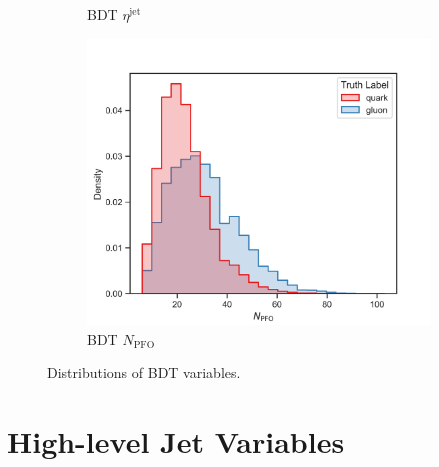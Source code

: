 \begin{figure}[!htb]
\begin{subfigure}[t]{0.45\textwidth}
        \caption{BDT $\eta^{\mathrm{jet}}$}
        \label{fig:app_bdt_eta_jet}
    \end{subfigure}
    \begin{subfigure}[t]{0.45\textwidth}
        \includegraphics[width=\linewidth]{src/plots/distributions/BDT/N_PFO.png}
        \caption{BDT $N_{\mathrm{PFO}}$}
        \label{fig:app_bdt_N_PFO}
    \end{subfigure}
\caption{Distributions of BDT variables.}
\label{fig:app_bdt_variables}
\end{figure}

\FloatBarrier
\newpage

\section{High-level Jet Variables}
\label{sec:app_high_level_variables}

